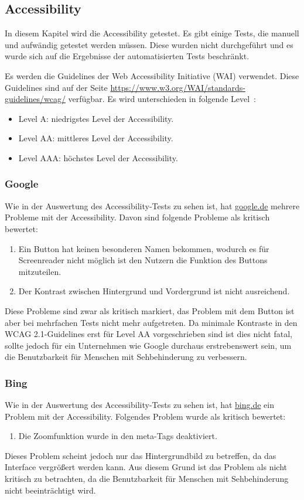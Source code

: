 \subsection{Accessibility}\label{subsec:accessibility}
In diesem Kapitel wird die Accessibility getestet.
Es gibt einige Tests, die manuell und aufwändig getestet werden müssen.
Diese wurden nicht durchgeführt und es wurde sich auf die Ergebnisse der automatisierten Tests beschränkt.

Es werden die Guidelines der Web Accessibility Initiative (WAI) verwendet.
Diese Guidelines sind auf der Seite \url{https://www.w3.org/WAI/standards-guidelines/wcag/} verfügbar.\newline
Es wird unterschieden in folgende Level~\cite{WCAG21}:
\begin{itemize}
\item Level A: niedrigstes Level der Accessibility.
\item Level AA: mittleres Level der Accessibility.
\item Level AAA: höchstes Level der Accessibility.
\end{itemize}

\subsubsection{Google}\label{subsubsec:google}
Wie in der Auswertung des Accessibility-Tests zu sehen ist, hat \url{google.de} mehrere Probleme mit der Accessibility.
Davon sind folgende Probleme als kritisch bewertet:
\begin{enumerate}
    \item Ein Button hat keinen besonderen Namen bekommen, wodurch es für Screenreader nicht möglich ist den Nutzern die Funktion des Buttons mitzuteilen.
    \item Der Kontrast zwischen Hintergrund und Vordergrund ist nicht ausreichend.
\end{enumerate}
Diese Probleme sind zwar als kritisch markiert, das Problem mit dem Button ist aber bei mehrfachen Tests nicht mehr aufgetreten.
Da minimale Kontraste in den WCAG 2.1-Guidelines erst für Level AA vorgeschrieben sind ist dies nicht fatal, sollte jedoch für ein Unternehmen wie Google durchaus erstrebenswert sein,
um die Benutzbarkeit für Menschen mit Sehbehinderung zu verbessern.

\subsubsection{Bing}\label{subsubsec:bing}
Wie in der Auswertung des Accessibility-Tests zu sehen ist, hat \url{bing.de} ein Problem mit der Accessibility.
Folgendes Problem wurde als kritisch bewertet:
\begin{enumerate}
    \item Die Zoomfunktion wurde in den meta-Tags deaktiviert.
\end{enumerate}
Dieses Problem scheint jedoch nur das Hintergrundbild zu betreffen, da das Interface vergrößert werden kann.
Aus diesem Grund ist das Problem als nicht kritisch zu betrachten, da die Benutzbarkeit für Menschen mit Sehbehinderung nicht beeinträchtigt wird.

